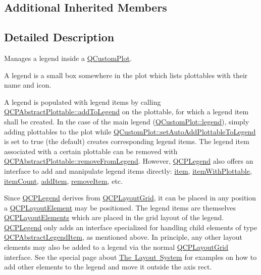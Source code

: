 \subsection*{Additional Inherited Members}


\subsection{Detailed Description}
Manages a legend inside a \mbox{\hyperlink{class_q_custom_plot}{Q\+Custom\+Plot}}. 

A legend is a small box somewhere in the plot which lists plottables with their name and icon.

A legend is populated with legend items by calling \mbox{\hyperlink{class_q_c_p_abstract_plottable_aa64e93cb5b606d8110d2cc0a349bb30f}{Q\+C\+P\+Abstract\+Plottable\+::add\+To\+Legend}} on the plottable, for which a legend item shall be created. In the case of the main legend (\mbox{\hyperlink{class_q_custom_plot_a4eadcd237dc6a09938b68b16877fa6af}{Q\+Custom\+Plot\+::legend}}), simply adding plottables to the plot while \mbox{\hyperlink{class_q_custom_plot_ad8858410c2db47b7104040a3aa61c3fc}{Q\+Custom\+Plot\+::set\+Auto\+Add\+Plottable\+To\+Legend}} is set to true (the default) creates corresponding legend items. The legend item associated with a certain plottable can be removed with \mbox{\hyperlink{class_q_c_p_abstract_plottable_a3cc235007e2343a65ad4f463767e0e20}{Q\+C\+P\+Abstract\+Plottable\+::remove\+From\+Legend}}. However, \mbox{\hyperlink{class_q_c_p_legend}{Q\+C\+P\+Legend}} also offers an interface to add and manipulate legend items directly\+: \mbox{\hyperlink{class_q_c_p_legend_acfe9694c45104a3359d3806ed366fcf7}{item}}, \mbox{\hyperlink{class_q_c_p_legend_a91e790002d8bf15a20628a8e8841e397}{item\+With\+Plottable}}, \mbox{\hyperlink{class_q_c_p_legend_a57ab86ab8b2a3762d4c1455eb5452c88}{item\+Count}}, \mbox{\hyperlink{class_q_c_p_legend_a3ab274de52d2951faea45a6d975e6b3f}{add\+Item}}, \mbox{\hyperlink{class_q_c_p_legend_ac91595c3eaa746fe6321d2eb952c63bb}{remove\+Item}}, etc.

Since \mbox{\hyperlink{class_q_c_p_legend}{Q\+C\+P\+Legend}} derives from \mbox{\hyperlink{class_q_c_p_layout_grid}{Q\+C\+P\+Layout\+Grid}}, it can be placed in any position a \mbox{\hyperlink{class_q_c_p_layout_element}{Q\+C\+P\+Layout\+Element}} may be positioned. The legend items are themselves \mbox{\hyperlink{class_q_c_p_layout_element}{Q\+C\+P\+Layout\+Elements}} which are placed in the grid layout of the legend. \mbox{\hyperlink{class_q_c_p_legend}{Q\+C\+P\+Legend}} only adds an interface specialized for handling child elements of type \mbox{\hyperlink{class_q_c_p_abstract_legend_item}{Q\+C\+P\+Abstract\+Legend\+Item}}, as mentioned above. In principle, any other layout elements may also be added to a legend via the normal \mbox{\hyperlink{class_q_c_p_layout_grid}{Q\+C\+P\+Layout\+Grid}} interface. See the special page about \mbox{\hyperlink{}{The Layout System}} for examples on how to add other elements to the legend and move it outside the axis rect.

